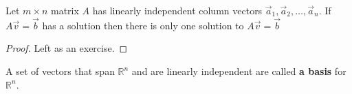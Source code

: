
\begin{proposition}\label{prop:ind_injective2} 
Let $m \times n$ matrix $A$ has linearly independent column vectors $\vec{a}_1, \vec{a}_2, \ldots, \vec{a}_n$. If $A\vec{v}=\vec{b}$ has a solution then there is only one solution to $A\vec{v}=\vec{b}$
\end{proposition}
\begin{proof}
Left as an exercise.
\end{proof}

\begin{definition}
A set of vectors that span $\mathbb{R}^n$ and are linearly independent are called \textbf{a basis} for $\mathbb{R}^n$. 
\end{definition}


